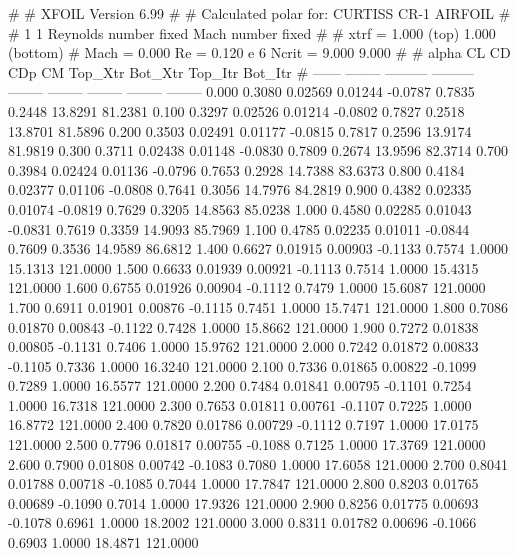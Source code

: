 #  
#       XFOIL         Version 6.99
#  
# Calculated polar for: CURTISS CR-1 AIRFOIL                            
#  
# 1 1 Reynolds number fixed          Mach number fixed         
#  
# xtrf =   1.000 (top)        1.000 (bottom)  
# Mach =   0.000     Re =     0.120 e 6     Ncrit =   9.000  9.000
#  
#   alpha    CL        CD       CDp       CM     Top_Xtr  Bot_Xtr  Top_Itr  Bot_Itr
#  ------ -------- --------- --------- -------- -------- -------- -------- --------
   0.000   0.3080   0.02569   0.01244  -0.0787   0.7835   0.2448  13.8291  81.2381
   0.100   0.3297   0.02526   0.01214  -0.0802   0.7827   0.2518  13.8701  81.5896
   0.200   0.3503   0.02491   0.01177  -0.0815   0.7817   0.2596  13.9174  81.9819
   0.300   0.3711   0.02438   0.01148  -0.0830   0.7809   0.2674  13.9596  82.3714
   0.700   0.3984   0.02424   0.01136  -0.0796   0.7653   0.2928  14.7388  83.6373
   0.800   0.4184   0.02377   0.01106  -0.0808   0.7641   0.3056  14.7976  84.2819
   0.900   0.4382   0.02335   0.01074  -0.0819   0.7629   0.3205  14.8563  85.0238
   1.000   0.4580   0.02285   0.01043  -0.0831   0.7619   0.3359  14.9093  85.7969
   1.100   0.4785   0.02235   0.01011  -0.0844   0.7609   0.3536  14.9589  86.6812
   1.400   0.6627   0.01915   0.00903  -0.1133   0.7574   1.0000  15.1313 121.0000
   1.500   0.6633   0.01939   0.00921  -0.1113   0.7514   1.0000  15.4315 121.0000
   1.600   0.6755   0.01926   0.00904  -0.1112   0.7479   1.0000  15.6087 121.0000
   1.700   0.6911   0.01901   0.00876  -0.1115   0.7451   1.0000  15.7471 121.0000
   1.800   0.7086   0.01870   0.00843  -0.1122   0.7428   1.0000  15.8662 121.0000
   1.900   0.7272   0.01838   0.00805  -0.1131   0.7406   1.0000  15.9762 121.0000
   2.000   0.7242   0.01872   0.00833  -0.1105   0.7336   1.0000  16.3240 121.0000
   2.100   0.7336   0.01865   0.00822  -0.1099   0.7289   1.0000  16.5577 121.0000
   2.200   0.7484   0.01841   0.00795  -0.1101   0.7254   1.0000  16.7318 121.0000
   2.300   0.7653   0.01811   0.00761  -0.1107   0.7225   1.0000  16.8772 121.0000
   2.400   0.7820   0.01786   0.00729  -0.1112   0.7197   1.0000  17.0175 121.0000
   2.500   0.7796   0.01817   0.00755  -0.1088   0.7125   1.0000  17.3769 121.0000
   2.600   0.7900   0.01808   0.00742  -0.1083   0.7080   1.0000  17.6058 121.0000
   2.700   0.8041   0.01788   0.00718  -0.1085   0.7044   1.0000  17.7847 121.0000
   2.800   0.8203   0.01765   0.00689  -0.1090   0.7014   1.0000  17.9326 121.0000
   2.900   0.8256   0.01775   0.00693  -0.1078   0.6961   1.0000  18.2002 121.0000
   3.000   0.8311   0.01782   0.00696  -0.1066   0.6903   1.0000  18.4871 121.0000
